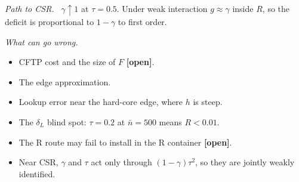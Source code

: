\documentclass[10pt,a4paper]{article}
\newcommand{\openflag}{\textcolor{red!65!black}{\textbf{[open]}}}
\newcommand{\nbar}{\bar n}
\newcommand{\sub}[1]{\par\textit{#1}\ }
\begin{document}
\sub{Path to CSR.} $\gamma\uparrow1$ at $\tau=0.5$. Under weak interaction $g\approx\gamma$ inside $R$, so the deficit is proportional to $1-\gamma$ to first order.
\sub{What can go wrong.}
\begin{itemize}
  \item CFTP cost and the size of $F$ \openflag.
  \item The edge approximation.
  \item Lookup error near the hard-core edge, where $h$ is steep.
  \item The $\delta_L$ blind spot: $\tau=0.2$ at $\nbar=500$ means $R<0.01$.
  \item The R route may fail to install in the R container \openflag.
  \item Near CSR, $\gamma$ and $\tau$ act only through $(1-\gamma)\tau^2$, so they are jointly weakly identified.
\end{itemize}
\end{document}
